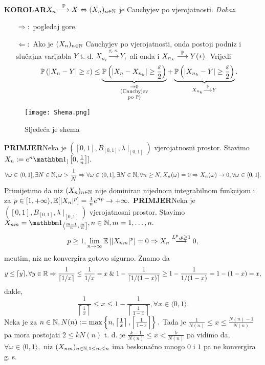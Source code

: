 \documentclass{article}
\begin{document}
\textbf{KOROLAR}\newline \(X_n\overset{\Bbb P}{\longrightarrow}X\Leftrightarrow (X_n)_{n\in\Bbb N}\) je Cauchyjev po vjerojatnosti.\newline\newline
\textit{Dokaz.}
\begin{itemize}
    \item[\(\boxed{\Rightarrow}:\)] pogledaj gore. 
    \item[\(\boxed{\Leftarrow}:\)] Ako je \((X_n)_{n\in\Bbb N}\) Cauchyjev po vjerojatnosti, onda postoji podniz i slučajna varijabla \(Y\) t. d. \(X_{n_k}\overset{\text{g. s.}}{\longrightarrow}Y,\) ali onda i \(X_{n_k}\overset{\Bbb P}{\longrightarrow}Y(*).\) Vrijedi \[\Bbb P\left(|X_n-Y|\ge\varepsilon\right)\le\underbrace{\Bbb P\left(|X_n-X_{n_k}|\ge\frac\varepsilon2\right)}_{\substack{\to 0\\(\text{Cauchyjev}\\\text{po } \Bbb P)}}+\underbrace{\Bbb P\left(|X_{n_k}-Y|\ge\frac\varepsilon2\right)}_{X_{n_k}\overset{\Bbb P}{\longrightarrow}Y}.\]
\end{itemize}
\begin{figure}[h!]
    \centering
    \texttt{[image: Shema.png]}
    \caption{Sljedeća je shema}
    \label{}
\end{figure}
\textbf{PRIMJER}\newline Neka je \(\left([0,1],B_{[0,1]},\lambda\mid_{[0,1]}\right)\) vjerojatnosni prostor. Stavimo \(X_n:=e^n\mathbbm 1_[\left[0,\frac1n\right]].\) \[\forall \omega\in\langle0,1],\exists N\in\Bbb N,\omega>\frac1N\Rightarrow\forall \omega\in\langle0,1],\exists N\in\Bbb N,\forall n\ge N,X_n(\omega)=0\Rightarrow X_n(\omega)\to 0,\forall \omega\in\langle0,1].\] Primijetimo da niz \((X_n)_{n\in\Bbb N}\) nije dominiran nijednom integrabilnom funkcijom i za \(p\in[1,+\infty\rangle,\Bbb E[|X_n|^p]=\frac1ne^{np}\to+\infty.\)\newline\newline 
\textbf{PRIMJER}\newline Neka je \(\left([0,1],B_{[0,1]},\lambda\mid_{[0,1]}\right)\) vjerojatnosni prostor. Stavimo \(X_{nm}=\mathbbm 1_{\left\langle\frac{m-1}n,\frac{m}n\right]},n\in\Bbb N,m=1,\ldots,n.\) \[p\ge1,\lim_{n\to\infty}\Bbb E\left[|X_{nm}|^p\right]=0\Rightarrow X_n\overset{L^p,p\ge 1}{\longrightarrow}0,\] me\dj{}utim, niz ne konvergira gotovo sigurno. Znamo da \[y\le\lceil y\rceil,\forall y\in\Bbb R\Rightarrow\frac1{\lceil 1/x\rceil}\le\frac1{1/x}=x\;\&\;1-\frac1{\lceil1/(1-x)\rceil}\ge1-\frac1{1/(1-x)}=1-(1-x)=x,\] dakle, \[\dfrac1{\left\lceil\frac1x\right\rceil}\le x\le1-\frac1{\left\lceil\frac1{1-x}\right\rceil},\forall x\in\langle0,1\rangle.\] Neka je za \(n\in\Bbb N, N(n):=\max\left\{n,\left\lceil\frac1x\right\rceil,\left\lceil\frac1{1-x}\right\rceil\right\}.\) Tada je \(\frac1{N(n)}\le x\le\frac{N(n)-1}{N(n)}\) pa mora postojati \(2\le k N(n)\) t. d. je \(\frac{k-1}{N(n)}\le x<\frac{k}{N(n)}\) pa vidimo da, \(\forall\omega\in\langle0,1\rangle,\) niz \((X_{nm})_{n\in\Bbb N,1\le m\le n}\) ima beskonačno mnogo \(0\) i \(1\) pa ne konvergira g. s.\newline\newline
\end{document}
